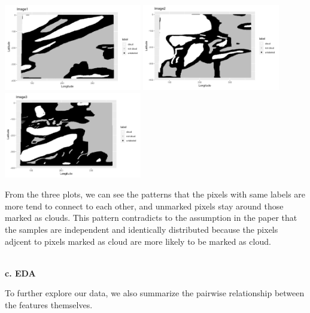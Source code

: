 \documentclass[11pt]{article}
\begin{document}
\includegraphics[width = 6cm]{1(b)image1.png}
\includegraphics[width = 6cm]{1(b)image2.png}
\includegraphics[width = 6cm]{1(b)image3.png}

From the three plots, we can see the patterns that the pixels with same labels are more tend to connect to each other, and unmarked pixels stay around those marked as clouds. This pattern contradicts to the assumption in the paper that the samples are independent and identically distributed because the pixels adjcent to pixels marked as cloud are more likely to be marked as cloud.


\vspace{0.3cm}
\mbox{}\\
\textbf{c. EDA}

To further explore our data, we also summarize the pairwise relationship between the features themselves.
\end{document}
